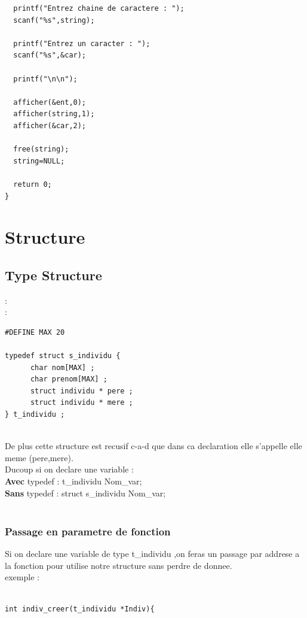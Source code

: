 \documentclass[a4paper,12pt,openany]{book}
\begin{document}
{\begin{verbatim}
  printf("Entrez chaine de caractere : ");
  scanf("%s",string);

  printf("Entrez un caracter : ");
  scanf("%s",&car);

  printf("\n\n");

  afficher(&ent,0);
  afficher(string,1);
  afficher(&car,2);

  free(string);
  string=NULL;

  return 0;
}
\end{verbatim}



\chapter{Structure}

\section{Type Structure}: \\

 : \\
\begin{verbatim}
#DEFINE MAX 20

typedef struct s_individu {
      char nom[MAX] ;
      char prenom[MAX] ;
      struct individu * pere ;
      struct individu * mere ;
} t_individu ; 
\end{verbatim}
\\
De plus cette structure est recusif c-a-d que dans ca declaration elle s'appelle elle meme (\*pere,\*mere).\\
Ducoup si on declare une variable :\\
\textbf{Avec} typedef : t\_individu Nom\_var;\\
\textbf{Sans} typedef : struct s\_individu Nom\_var;\\
\\

\subsection{Passage en parametre de fonction}

Si on declare une variable de type t\_individu ,on feras un passage par addrese a la fonction pour utilise notre structure sans perdre de donnee.\\
exemple :\\
\\
\begin{verbatim}
int indiv_creer(t_individu *Indiv){
  

\end{verbatim}}
\end{document}
